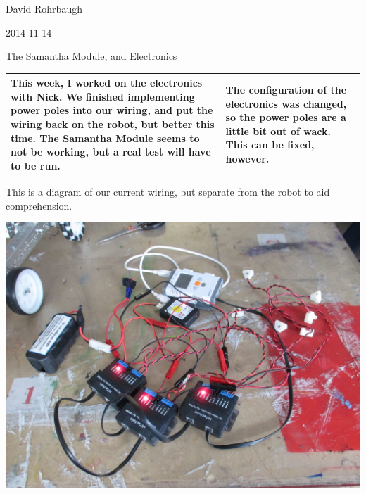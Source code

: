 David Rohrbaugh

2014-11-14

The Samantha Module, and Electronics

\begin{tabular}{|p{5cm}|p{5cm}|}
 \hline
 This week, I worked on the electronics with Nick. We finished implementing power poles into our wiring, and put the wiring back on the robot, but better this time. The Samantha Module seems to not be working, but a real test will have to be run.
 &
 The configuration of the electronics was changed, so the power poles are a little bit out of wack. This can be fixed, however.
 \\
 \hline
\end{tabular}

\medskip

This is a diagram of our current wiring, but separate from the robot to aid comprehension.

\begin{center}
 \includegraphics[width=\textwidth]{./Entries/Images/detached_wiring.jpg}
\end{center}
